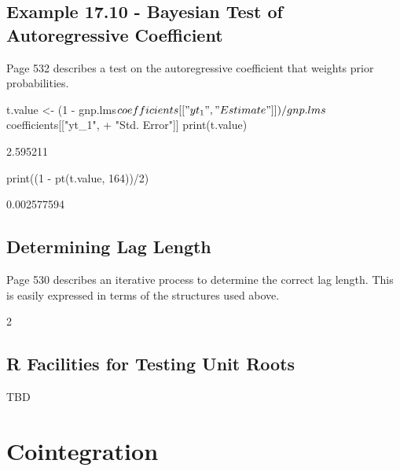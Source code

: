 \documentclass[a4paper]{article}
\renewcommand{\~}{\perispomeni}%
\begin{document}
\subsection{Example 17.10 - Bayesian Test of Autoregressive Coefficient}
Page 532 describes a test on the autoregressive coefficient that weights prior probabilities.
\begin{Schunk}
\begin{Sinput}
 t.value <- (1 - gnp.lms$coefficients[["yt_1", "Estimate"]])/gnp.lms$coefficients[["yt_1", 
+     "Std. Error"]]
 print(t.value)
\end{Sinput}
\begin{Soutput}
[1] 2.595211
\end{Soutput}
\begin{Sinput}
 print((1 - pt(t.value, 164))/2)
\end{Sinput}
\begin{Soutput}
[1] 0.002577594
\end{Soutput}
\end{Schunk}
\subsection{Determining Lag Length}
Page 530 describes an iterative process to determine the correct lag length.  This is easily expressed
in terms of the structures used above.
\begin{Schunk}
\begin{Soutput}
[1] 2
\end{Soutput}
\end{Schunk}
\subsection{R Facilities for Testing Unit Roots}
TBD

\section{Cointegration}
\end{document}
